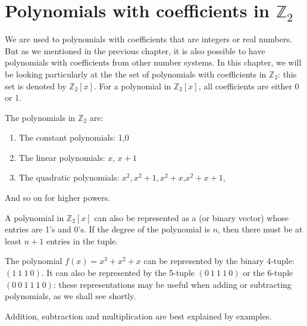 

\section{Polynomials with coefficients in $\mathbb{Z}_2$}\label{sec:polycodes:1}
We are used to polynomials with coefficients that are integers or real numbers. But as we mentioned in the previous chapter, it is also possible to have polynomials with coefficients from other number systems. In this chapter, we will be looking particularly 
at the the set of polynomials with coefficients in  $\mathbb{Z}_2$: this set is denoted by $\mathbb{Z}_2[x]$.
For a polynomial in $\mathbb{Z}_2[x]$, all coefficients are either 0 or 1.

\begin {example}{}
The polynomials in $\mathbb{Z}_2$ are:
\begin {enumerate}[.]
\item
The constant polynomials: 1,0
\item
The linear polynomials: $x$, $x+1$
\item
The quadratic polynomials: $x^2, x^2+1, x^2 + x$,$x^2 + x+1$,
\end {enumerate}
And so on for higher powers.
\end {example}
A polynomial in $\mathbb{Z}_2[x]$ can also be represented as a  (or binary vector) whose entries are 1's and 0's. If the degree of the polynomial is $n$, then there must be at least $n+1$ entries in the tuple.

\begin {example}{}
The polynomial $f(x) = x^3 + x^2 + x $ can be represented by the binary 4-tuple: $(1~1~1~0)$.  It can also be represented by the 5-tuple $(0~1~1~1~0)$ or the 6-tuple $(0~0~1~1~1~0)$: these representations may be useful when adding or subtracting polynomials, as we shall see shortly.
\end{example}

Addition, subtraction and multiplication are best explained by examples.

